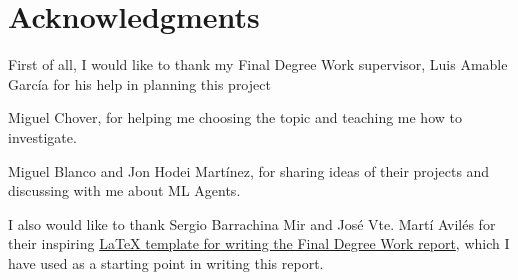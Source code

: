 %
%
%

\chapter*{Acknowledgments}

First of all, I would like to thank my Final Degree Work supervisor, Luis Amable García for his help in planning this project

Miguel Chover, for helping me choosing the topic and teaching me how to investigate.

Miguel Blanco and Jon Hodei Martínez, for sharing ideas of their projects and discussing with me about ML Agents.

I also would like to thank Sergio Barrachina Mir and José Vte. Martí Avilés for their inspiring \href{http://lorca.act.uji.es/curso/latex/}{LaTeX template for writing the Final Degree Work report}, which I have used as a starting point in writing this report.


\cleardoublepage{}
